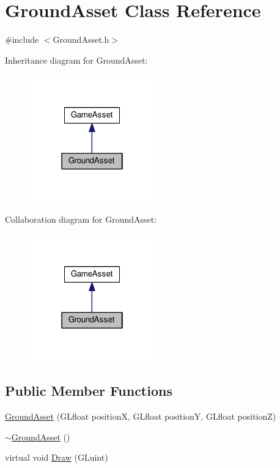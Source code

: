 \hypertarget{classGroundAsset}{}\section{Ground\+Asset Class Reference}
\label{classGroundAsset}


{\ttfamily \#include $<$Ground\+Asset.\+h$>$}



Inheritance diagram for Ground\+Asset\+:
\nopagebreak
\begin{figure}[H]
\begin{center}
\leavevmode
\includegraphics[width=154pt]{classGroundAsset__inherit__graph}
\end{center}
\end{figure}


Collaboration diagram for Ground\+Asset\+:
\nopagebreak
\begin{figure}[H]
\begin{center}
\leavevmode
\includegraphics[width=154pt]{classGroundAsset__coll__graph}
\end{center}
\end{figure}
\subsection*{Public Member Functions}
\begin{DoxyCompactItemize}
\item 
\hyperlink{classGroundAsset_a493494c1bd94300099dac97254e97877}{Ground\+Asset} (G\+Lfloat position\+X, G\+Lfloat position\+Y, G\+Lfloat position\+Z)
\item 
\hyperlink{classGroundAsset_a8f607f3cabded6280c5a5eb2cbfa8c79}{$\sim$\+Ground\+Asset} ()
\item 
virtual void \hyperlink{classGroundAsset_a440f983638c7a7ccb6a39718444dfe95}{Draw} (G\+Luint)
\end{DoxyCompactItemize}


